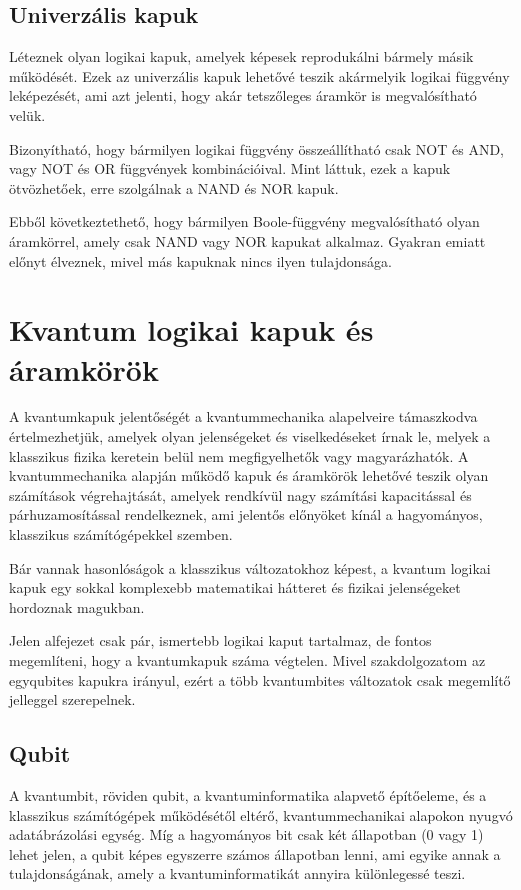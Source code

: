 \documentclass[
]{thesis-ekf}
\theoremstyle{definition}
\theoremstyle{remark}
\begin{document}
\subsection{Univerzális kapuk}
Léteznek olyan logikai kapuk, amelyek képesek reprodukálni bármely másik működését. Ezek az univerzális kapuk lehetővé teszik akármelyik logikai függvény leképezését, ami azt jelenti, hogy akár tetszőleges áramkör is megvalósítható velük.

Bizonyítható, hogy bármilyen logikai függvény összeállítható csak NOT és AND, vagy NOT és OR függvények kombinációival. Mint láttuk, ezek a kapuk ötvözhetőek, erre szolgálnak a NAND és NOR kapuk.\cite{Chris Bernhardt}

Ebből következtethető, hogy bármilyen Boole-függvény megvalósítható olyan áramkörrel, amely csak NAND vagy NOR kapukat alkalmaz. Gyakran emiatt előnyt élveznek, mivel más kapuknak nincs ilyen tulajdonsága.

\section{Kvantum logikai kapuk és áramkörök}
A kvantumkapuk jelentőségét a kvantummechanika alapelveire támaszkodva értelmezhetjük, amelyek olyan jelenségeket és viselkedéseket írnak le, melyek a klasszikus fizika keretein belül nem megfigyelhetők vagy magyarázhatók. A kvantummechanika alapján működő kapuk és áramkörök lehetővé teszik olyan számítások végrehajtását, amelyek rendkívül nagy számítási kapacitással és párhuzamosítással rendelkeznek, ami jelentős előnyöket kínál a hagyományos, klasszikus számítógépekkel szemben.

Bár vannak hasonlóságok a klasszikus változatokhoz képest, a kvantum logikai kapuk egy sokkal komplexebb matematikai hátteret és fizikai jelenségeket hordoznak magukban.

Jelen alfejezet csak pár, ismertebb logikai kaput tartalmaz, de fontos megemlíteni, hogy a kvantumkapuk száma végtelen. Mivel szakdolgozatom az egyqubites kapukra irányul, ezért a több kvantumbites változatok csak megemlítő jelleggel szerepelnek.

\subsection{Qubit}
A kvantumbit, röviden qubit, a kvantuminformatika alapvető építőeleme, és a klasszikus számítógépek működésétől eltérő, kvantummechanikai alapokon nyugvó adatábrázolási egység. Míg a hagyományos bit csak két állapotban (0 vagy 1) lehet jelen, a qubit képes egyszerre számos állapotban lenni, ami egyike annak a tulajdonságának, amely a kvantuminformatikát annyira különlegessé teszi.
\end{document}
